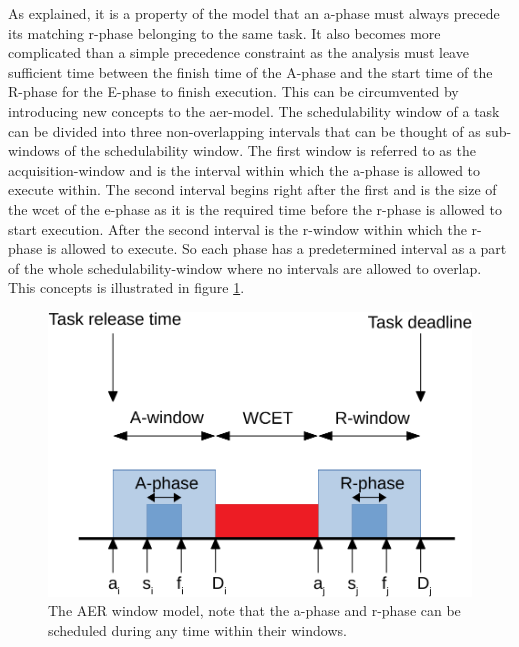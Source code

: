 \documentclass{kththesis}
\begin{document}
As explained, it is a property of the model that an \acrshort{a}-phase must always precede its
matching \acrshort{r}-phase belonging to the same task. It also becomes more complicated than a
simple precedence constraint as the analysis must leave sufficient time between the finish time of
the A-phase and the start time of the R-phase for the E-phase to finish execution. This can be
circumvented by introducing new concepts to the \acrshort{aer}-model. The schedulability window of a
task can be divided into three non-overlapping intervals that can be thought of as sub-windows of
the schedulability window. The first window is referred to as the acquisition-window and is the
interval within which the \acrshort{a}-phase is allowed to execute within. The second interval
begins right after the first and is the size of the \acrshort{wcet} of the \acrshort{e}-phase as it
is the required time before the \acrshort{r}-phase is allowed to start execution. After the second
interval is the \acrshort{r}-window within which the \acrshort{r}-phase is allowed to execute. So
each phase has a predetermined interval as a part of the whole schedulability-window where no
intervals are allowed to overlap. This concepts is illustrated in figure \ref{fig:aer_window_model}.


\begin{figure}

    \centering

    \includegraphics[width=0.8\linewidth]{images/aer_window_model.pdf}

    \caption{The AER window model, note that the \acrshort{a}-phase and \acrshort{r}-phase can be
    scheduled during any time within their windows.}

    \label{fig:aer_window_model}

\end{figure}
\end{document}
